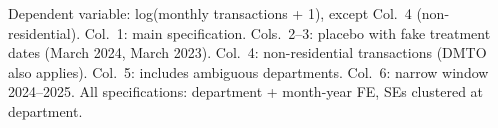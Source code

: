 \begin{table}[htbp]
   \par \raggedright
   Dependent variable: log(monthly transactions + 1), except Col.~4 (non-residential). Col.~1: main specification. Cols.~2--3: placebo with fake treatment dates (March 2024, March 2023). Col.~4: non-residential transactions (DMTO also applies). Col.~5: includes ambiguous departments. Col.~6: narrow window 2024--2025. All specifications: department + month-year FE, SEs clustered at department.
\end{table}
